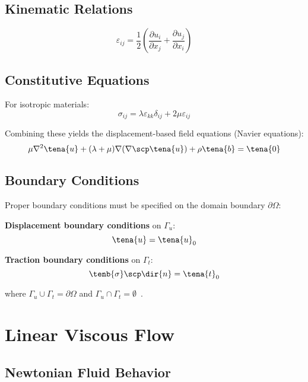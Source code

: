 \subsection{Kinematic Relations}
\begin{equation}
\varepsilon_{ij} = \frac{1}{2}\left(\frac{\partial u_i}{\partial x_j} + \frac{\partial u_j}{\partial x_i}\right)
\end{equation}

\subsection{Constitutive Equations}
For isotropic materials:
\begin{equation}
\sigma_{ij} = \lambda \varepsilon_{kk} \delta_{ij} + 2\mu \varepsilon_{ij}
\end{equation}

Combining these yields the displacement-based field equations (Navier equations):
\begin{equation}
\mu \nabla^2 \tena{u} + (\lambda + \mu) \nabla(\nabla \scp \tena{u}) + \rho \tena{b} = \tena{0}
\end{equation}

\subsection{Boundary Conditions}

Proper boundary conditions must be specified on the domain boundary $\partial\Omega$:

\textbf{Displacement boundary conditions} on $\Gamma_u$:
\begin{equation}
\tena{u} = \tena{u}_0
\end{equation}

\textbf{Traction boundary conditions} on $\Gamma_t$:
\begin{equation}
\tenb{\sigma} \scp \dir{n} = \tena{t}_0
\end{equation}

where $\Gamma_u \cup \Gamma_t = \partial\Omega$ and $\Gamma_u \cap \Gamma_t = \emptyset$~\autocite{Sadd.2019}.

\section{Linear Viscous Flow}

\subsection{Newtonian Fluid Behavior}

